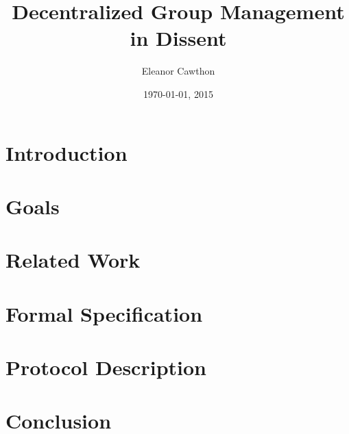 \documentclass[finalcopy,nolof,nolot]{srpaper}
\title{Decentralized Group Management in Dissent}
\author{Eleanor Cawthon}
\date{\today, 2015}
\begin{document}
\frontmatter

\chapter{Introduction}\label{Chapter:Intro}


\chapter{Goals}\label{Chapter:Goals}


\chapter{Related Work}\label{Chapter:Existing}


% 
%
\chapter{Formal Specification}\label{Chapter:Spec}


\chapter{Protocol Description}\label{Chapter:Protocol}


\chapter{Conclusion}\label{Chapter:Conclusion}


\listoftodos

% 

%   
% 
\end{document}
